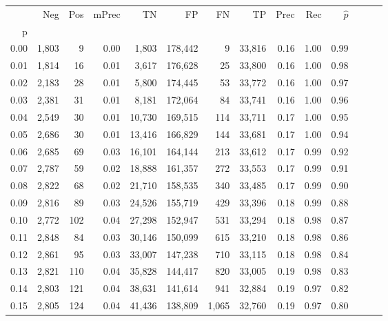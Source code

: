 \begin{tabular}{rrrrrrrrrrrrrr}
\toprule
{} &    Neg &  Pos & mPrec &       TN &       FP &      FN &      TP &  Prec &   Rec & $\hat{p}$ \\
p    &        &      &       &          &          &         &         &       &       &           \\
\midrule
0.00 &  1,803 &    9 &  0.00 &    1,803 &  178,442 &       9 &  33,816 &  0.16 &  1.00 &      0.99 \\
0.01 &  1,814 &   16 &  0.01 &    3,617 &  176,628 &      25 &  33,800 &  0.16 &  1.00 &      0.98 \\
0.02 &  2,183 &   28 &  0.01 &    5,800 &  174,445 &      53 &  33,772 &  0.16 &  1.00 &      0.97 \\
0.03 &  2,381 &   31 &  0.01 &    8,181 &  172,064 &      84 &  33,741 &  0.16 &  1.00 &      0.96 \\
0.04 &  2,549 &   30 &  0.01 &   10,730 &  169,515 &     114 &  33,711 &  0.17 &  1.00 &      0.95 \\
0.05 &  2,686 &   30 &  0.01 &   13,416 &  166,829 &     144 &  33,681 &  0.17 &  1.00 &      0.94 \\
0.06 &  2,685 &   69 &  0.03 &   16,101 &  164,144 &     213 &  33,612 &  0.17 &  0.99 &      0.92 \\
0.07 &  2,787 &   59 &  0.02 &   18,888 &  161,357 &     272 &  33,553 &  0.17 &  0.99 &      0.91 \\
0.08 &  2,822 &   68 &  0.02 &   21,710 &  158,535 &     340 &  33,485 &  0.17 &  0.99 &      0.90 \\
0.09 &  2,816 &   89 &  0.03 &   24,526 &  155,719 &     429 &  33,396 &  0.18 &  0.99 &      0.88 \\
0.10 &  2,772 &  102 &  0.04 &   27,298 &  152,947 &     531 &  33,294 &  0.18 &  0.98 &      0.87 \\
0.11 &  2,848 &   84 &  0.03 &   30,146 &  150,099 &     615 &  33,210 &  0.18 &  0.98 &      0.86 \\
0.12 &  2,861 &   95 &  0.03 &   33,007 &  147,238 &     710 &  33,115 &  0.18 &  0.98 &      0.84 \\
0.13 &  2,821 &  110 &  0.04 &   35,828 &  144,417 &     820 &  33,005 &  0.19 &  0.98 &      0.83 \\
0.14 &  2,803 &  121 &  0.04 &   38,631 &  141,614 &     941 &  32,884 &  0.19 &  0.97 &      0.82 \\
0.15 &  2,805 &  124 &  0.04 &   41,436 &  138,809 &   1,065 &  32,760 &  0.19 &  0.97 &      0.80 \\

\end{tabular}
